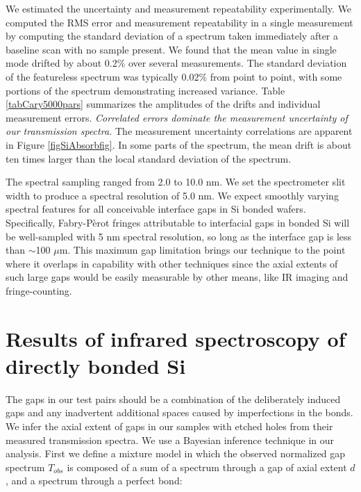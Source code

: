 \documentclass[osajnl,preprint,showpacs,superscriptaddress,12pt]{revtex4-1} %
\begin{document}
We estimated the uncertainty and measurement repeatability experimentally.  We computed the RMS error and measurement repeatability in a single measurement by computing the standard deviation of a spectrum taken immediately after a baseline scan with no sample present.  We found that the mean value in single mode drifted by about 0.2\% over several measurements.  The standard deviation of the featureless spectrum was typically 0.02\% from point to point, with some portions of the spectrum demonstrating increased variance.  Table \ref{tabCary5000pars} summarizes the amplitudes of the drifts and individual measurement errors.  \emph{Correlated errors dominate the measurement uncertainty of our transmission spectra.}  The measurement uncertainty correlations are apparent in Figure \ref{figSiAbsorbfig}.  In some parts of the spectrum, the mean drift is about ten times larger than the local standard deviation of the spectrum.

The spectral sampling ranged from 2.0 to 10.0 nm.  We set the spectrometer slit width to produce a spectral resolution of 5.0 nm.  We expect smoothly varying spectral features for all conceivable interface gaps in Si bonded wafers.  Specifically, Fabry-P\`erot fringes attributable to interfacial gaps in bonded Si will be well-sampled with 5 nm spectral resolution, so long as the interface gap is less than $\sim$100 $\mu$m.  This maximum gap limitation brings our technique to the point where it overlaps in capability with other techniques since the axial extents of such large gaps would be easily measurable by other means, like IR imaging and fringe-counting.




\section{Results of infrared spectroscopy of directly bonded Si}
\label{secResults}

The gaps in our test pairs should be a combination of the deliberately induced gaps and any inadvertent additional spaces caused by imperfections in the bonds.  We infer the axial extent of gaps in our samples with etched holes from their measured transmission spectra.  We use a Bayesian inference technique in our analysis.  First we define a mixture model in which the observed normalized gap spectrum $T_{obs}$ is composed of a sum of a spectrum through a gap of axial extent $d$, and a spectrum through a perfect bond:
\end{document}
